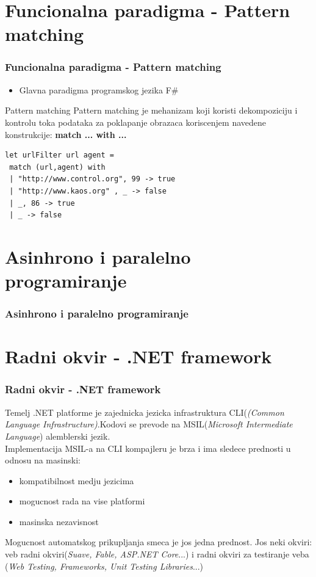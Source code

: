 \documentclass{beamer}
\begin{document}
\section{Funcionalna paradigma - Pattern matching}  
\begin{frame}[fragile]
\frametitle{Funcionalna paradigma - Pattern matching}

\begin{itemize}
  \item Glavna paradigma programskog jezika F\#
\end{itemize}

\begin{block}{Pattern matching}
Pattern matching je mehanizam koji koristi dekompoziciju i kontrolu toka podataka za poklapanje obrazaca koriscenjem navedene konstrukcije:
\textbf{ match ... with ...}
\begin{lstlisting}
let urlFilter url agent =
 match (url,agent) with
 | "http://www.control.org", 99 -> true
 | "http://www.kaos.org" , _ -> false
 | _, 86 -> true
 | _ -> false
\end{lstlisting} 
\end{block}

\end{frame}

\section{Asinhrono i paralelno programiranje}
\begin{frame}[fragile]
\frametitle{Asinhrono i paralelno programiranje}



\end{frame}

\section{Radni okvir - .NET framework}
\begin{frame}[fragile]
\frametitle{Radni okvir - .NET framework}
Temelj .NET platforme je zajednicka jezicka infrastruktura CLI({\em(Common Language Infrastructure)}.Kodovi se prevode na MSIL({\em Microsoft Intermediate Language}) alemblerski jezik.\\
Implementacija MSIL-a na CLI kompajleru je brza i ima sledece prednosti u odnosu na masinski:
\begin{itemize}
	\item kompatibilnost medju jezicima
	\item mogucnost rada na vise platformi
	\item masinska nezavisnost
\end{itemize}
Mogucnost automatskog prikupljanja smeca je jos jedna prednost.
Jos neki okviri: veb radni okviri({\em Suave, Fable, ASP.NET Core}...) i radni okviri za testiranje veba ({\em Web Testing, Frameworks, Unit Testing Libraries}...)
\end{frame}
\end{document}
